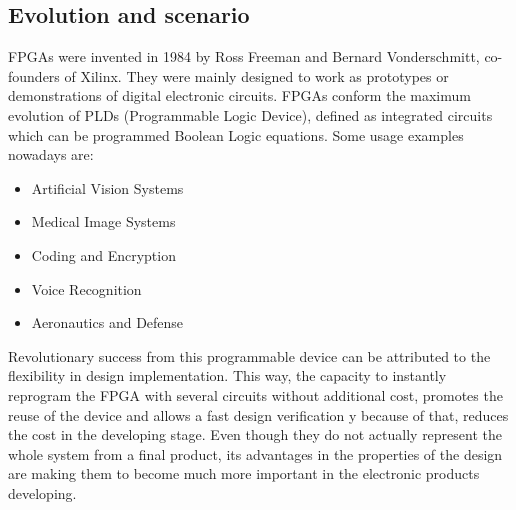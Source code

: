 \subsection{Evolution and scenario}

FPGAs were invented in 1984 by Ross Freeman and Bernard Vonderschmitt, co-founders of Xilinx\cite{Xilinkx}. They were mainly designed to work as prototypes or demonstrations of digital electronic circuits. FPGAs conform the maximum evolution of PLDs (Programmable Logic Device), defined as integrated circuits which can be programmed Boolean Logic equations. Some usage examples nowadays are:
\begin{itemize}
	\item Artificial Vision Systems
	\item Medical Image Systems
	\item Coding and Encryption
	\item Voice Recognition
	\item Aeronautics and Defense
\end{itemize}

Revolutionary success from this programmable device can be attributed to the flexibility in design implementation. This way, the capacity to instantly reprogram the FPGA with several circuits without additional cost, promotes the reuse of the device and allows a fast design verification y because of that, reduces the cost in the developing stage. Even though they do not actually represent the whole system from a final product, its advantages in the properties of the design are making them to become much more important in the electronic products developing. \newline

